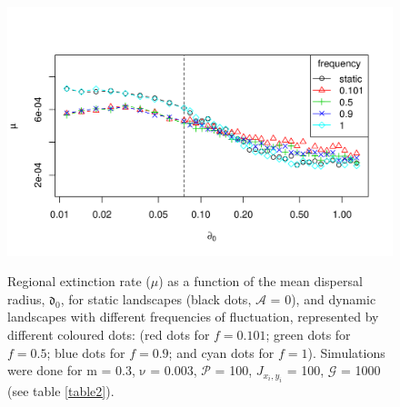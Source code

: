 \documentclass[a4paper,12pt]{article}
\begin{document}
\begin{figure}[hb!]
\begin{center}
\includegraphics[width=\textwidth]{newfigures/steadyState_extrate.png}
\label{fig:ExtRate} 
\caption{Regional extinction rate ($\mu$) as a function of the mean dispersal radius, $\mathfrak{d_{0}}$, for static landscapes (black dots, $\mathcal{A}$ = 0), and dynamic landscapes with different frequencies of fluctuation, represented by different coloured dots: (red dots for $f = 0.101$; green dots for $f = 0.5$; blue dots for $f = 0.9$; and cyan dots for $f = 1$). Simulations were done for $\mathrm{m}$ = 0.3, $\mathrm{\nu}$ = 0.003, $\mathcal{P}$ = 100, $J_{x_i,y_i}$ = 100, $\mathcal{G}$ = 1000 (see table \ref{table2}).}
\end{center}
\end{figure}
\end{document}
